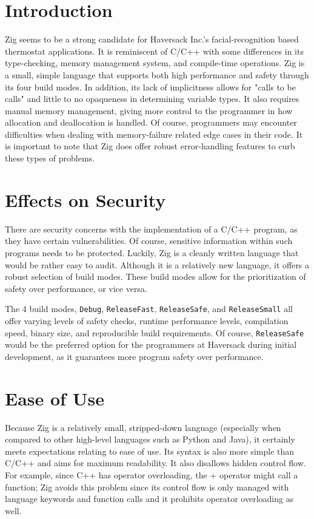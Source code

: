 \section{Introduction}
Zig seems to be a strong candidate for Haversack Inc.'s facial-recognition based thermostat applications. It is reminiscent of C/C++ with some differences in its type-checking, memory management system, and compile-time operations. Zig is a small, simple language that supports both high performance and safety through its four build modes. In addition, its lack of implicitness allows for "calls to be calls" and little to no opaqueness in determining variable types. It also requires manual memory management, giving more control to the programmer in how allocation and deallocation is handled. Of course, programmers may encounter difficulties when dealing with memory-failure related edge cases in their code. It is important to note that Zig does offer robust error-handling features to curb these types of problems. 

\section{Effects on Security}
There are security concerns with the implementation of a C/C++ program, as they have certain vulnerabilities. Of course, sensitive information within such programs needs to be protected. Luckily, Zig is a cleanly written language that would be rather easy to audit. Although it is a relatively new language, it offers a robust selection of build modes. These build modes allow for the prioritization of safety over performance, or vice versa.
 
The 4 build modes, \verb +Debug+, \verb +ReleaseFast+, \verb +ReleaseSafe+, and \verb +ReleaseSmall+ all offer varying levels of safety checks, runtime performance levels, compilation speed, binary size, and reproducible build requirements. Of course, \verb +ReleaseSafe+ would be the preferred option for the programmers at Haversack during initial development, as it guarantees more program safety over performance.

\section{Ease of Use}
Because Zig is a relatively small, stripped-down language (especially when compared to other high-level languages such as Python and Java), it certainly meets expectations relating to ease of use. Its syntax is also more simple than C/C++ and aims for maximum readability. It also disallows hidden control flow. For example, since C++ has operator overloading, the + operator might call a function; Zig avoids this problem since its control flow is only managed with language keywords and function calls and it prohibits operator overloading as well. 

